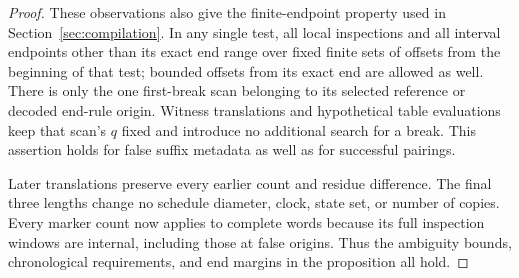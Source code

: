 \begin{proof}
These observations also give the finite-endpoint property used in
Section~\ref{sec:compilation}.  In any single test, all local
inspections and all interval endpoints other than its exact end
range over fixed finite sets of offsets from the beginning of that
test; bounded offsets from its exact end are allowed as well.
There is only the one first-break scan belonging to its selected
reference or decoded end-rule origin.  Witness translations and
hypothetical table evaluations keep that scan's \(q\) fixed and
introduce no additional search for a break.  This assertion holds
for false suffix metadata as well as for successful pairings.

Later translations preserve every earlier count and residue
difference. The final three lengths change no schedule diameter,
clock, state set, or number of copies. Every marker count now applies
to complete words because its full inspection windows are internal,
including those at false origins. Thus the ambiguity bounds,
chronological requirements, and end margins in the proposition all hold.
\end{proof}
